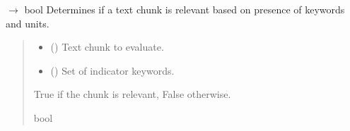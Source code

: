 \documentclass[letterpaper,10pt,english]{sphinxmanual}
\begin{document}

\begin{fulllineitems}
\label{\detokenize{autoapi/modules/input/emissions_parser/index:modules.input.emissions_parser.is_relevant_chunk}}
\pysigstartsignatures
\pysiglinewithargsret
{}
{\sphinxparamcomma {}}
{{ $\rightarrow$ bool}}
\pysigstopsignatures
\sphinxAtStartPar
Determines if a text chunk is relevant based on presence of keywords and units.
\begin{quote}\begin{description}
\begin{itemize}
\item {} 
\sphinxAtStartPar
{} () \textendash{} Text chunk to evaluate.

\item {} 
\sphinxAtStartPar
{} () \textendash{} Set of indicator keywords.

\end{itemize}

\sphinxAtStartPar
True if the chunk is relevant, False otherwise.

\sphinxAtStartPar
bool

\end{description}\end{quote}

\end{fulllineitems}


\begin{fulllineitems}
\label{\detokenize{autoapi/modules/input/emissions_parser/index:modules.input.emissions_parser.session}}
\pysigstartsignatures
\pysigline
{}
\pysigstopsignatures
\end{fulllineitems}
\end{document}
